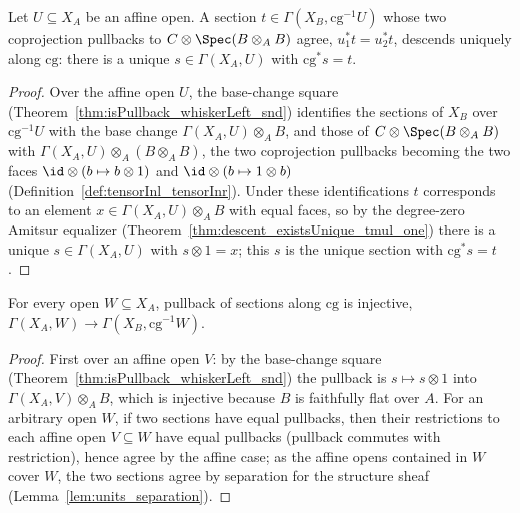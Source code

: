 \begin{theorem}
  \label{thm:existsUnique_appLE_eq}
  \leanok
  Let \(U \subseteq X_A\) be an affine open. A section \(t \in \Gamma(X_B, \mathrm{cg}^{-1}U)\)
  whose two coprojection pullbacks to \(C \otimes \Spec(B \otimes_A B)\) agree,
  \(u_1^{*} t = u_2^{*} t\), descends uniquely along \(\mathrm{cg}\): there is a unique \(s \in
  \Gamma(X_A, U)\) with \(\mathrm{cg}^{*} s = t\).
\end{theorem}
\begin{proof}
  \leanok
  Over the affine open \(U\), the base-change square (Theorem~\ref{thm:isPullback_whiskerLeft_snd})
  identifies the sections of \(X_B\) over \(\mathrm{cg}^{-1}U\) with the base change \(\Gamma(X_A,
  U) \otimes_A B\), and those of \(C \otimes \Spec(B \otimes_A B)\) with \(\Gamma(X_A, U)
  \otimes_A (B \otimes_A B)\), the two coprojection pullbacks becoming the two faces
  \(\id \otimes (b \mapsto b \otimes 1)\) and \(\id \otimes (b \mapsto 1 \otimes b)\)
  (Definition~\ref{def:tensorInl_tensorInr}).  Under these identifications \(t\) corresponds to
  an element \(x \in \Gamma(X_A, U) \otimes_A B\) with equal faces, so by the degree-zero Amitsur
  equalizer (Theorem~\ref{thm:descent_existsUnique_tmul_one}) there is a unique \(s \in \Gamma(X_A,
  U)\) with \(s \otimes 1 = x\); this \(s\) is the unique section with \(\mathrm{cg}^{*} s = t\).
\end{proof}

\begin{theorem}
  \label{thm:appLE_whiskerLeft_injective}
  \leanok
  For every open \(W \subseteq X_A\), pullback of sections along \(\mathrm{cg}\) is injective,
  \(\Gamma(X_A, W) \to \Gamma(X_B, \mathrm{cg}^{-1}W)\).
\end{theorem}
\begin{proof}
  \leanok
  First over an affine open \(V\): by the base-change square
  (Theorem~\ref{thm:isPullback_whiskerLeft_snd}) the pullback is \(s \mapsto s \otimes 1\) into
  \(\Gamma(X_A, V) \otimes_A B\), which is injective because \(B\) is faithfully flat over
  \(A\).  For an arbitrary open \(W\), if two sections have equal pullbacks, then their
  restrictions to each affine open \(V \subseteq W\) have equal pullbacks (pullback commutes
  with restriction), hence agree by the affine case; as the affine opens contained in \(W\)
  cover \(W\), the two sections agree by separation for the structure sheaf
  (Lemma~\ref{lem:units_separation}).
\end{proof}

